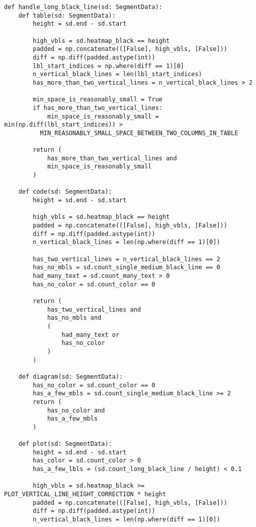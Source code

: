 \begin{lstlisting}[caption={Функция handle\_long\_black\_line}, label={lst:hlbl}]
def handle_long_black_line(sd: SegmentData):
    def table(sd: SegmentData):
        height = sd.end - sd.start

        high_vbls = sd.heatmap_black == height
        padded = np.concatenate(([False], high_vbls, [False]))
        diff = np.diff(padded.astype(int))
        lbl_start_indices = np.where(diff == 1)[0]
        n_vertical_black_lines = len(lbl_start_indices)
        has_more_than_two_vertical_lines = n_vertical_black_lines > 2

        min_space_is_reasonably_small = True
        if has_more_than_two_vertical_lines:
            min_space_is_reasonably_small = min(np.diff(lbl_start_indices)) >
          MIN_REASONABLY_SMALL_SPACE_BETWEEN_TWO_COLUMNS_IN_TABLE

        return (
            has_more_than_two_vertical_lines and
            min_space_is_reasonably_small
        )

    def code(sd: SegmentData):
        height = sd.end - sd.start

        high_vbls = sd.heatmap_black == height
        padded = np.concatenate(([False], high_vbls, [False]))
        diff = np.diff(padded.astype(int))
        n_vertical_black_lines = len(np.where(diff == 1)[0])

        has_two_vertical_lines = n_vertical_black_lines == 2
        has_no_mbls = sd.count_single_medium_black_line == 0
        had_many_text = sd.count_many_text > 0
        has_no_color = sd.count_color == 0

        return (
            has_two_vertical_lines and
            has_no_mbls and
            (
                had_many_text or
                has_no_color
            )
        )

    def diagram(sd: SegmentData):
        has_no_color = sd.count_color == 0
        has_a_few_mbls = sd.count_single_medium_black_line >= 2
        return (
            has_no_color and
            has_a_few_mbls
        )

    def plot(sd: SegmentData):
        height = sd.end - sd.start
        has_color = sd.count_color > 0
        has_a_few_lbls = (sd.count_long_black_line / height) < 0.1

        high_vbls = sd.heatmap_black >= PLOT_VERTICAL_LINE_HEIGHT_CORRECTION * height
        padded = np.concatenate(([False], high_vbls, [False]))
        diff = np.diff(padded.astype(int))
        n_vertical_black_lines = len(np.where(diff == 1)[0])


\end{lstlisting}
